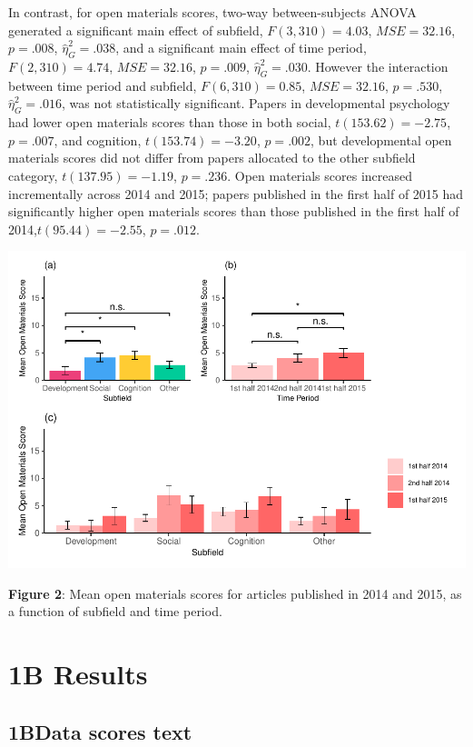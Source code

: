\documentclass[
  english,
  man]{apa6}
\begin{document}
In contrast, for open materials scores, two-way between-subjects ANOVA generated a significant main effect of subfield, \(F(3, 310) = 4.03\), \(\mathit{MSE} = 32.16\), \(p = .008\), \(\hat{\eta}^2_G = .038\), and a significant main effect of time period, \(F(2, 310) = 4.74\), \(\mathit{MSE} = 32.16\), \(p = .009\), \(\hat{\eta}^2_G = .030\). However the interaction between time period and subfield, \(F(6, 310) = 0.85\), \(\mathit{MSE} = 32.16\), \(p = .530\), \(\hat{\eta}^2_G = .016\), was not statistically significant. Papers in developmental psychology had lower open materials scores than those in both social, \(t(153.62) = -2.75\), \(p = .007\), and cognition, \(t(153.74) = -3.20\), \(p = .002\), but developmental open materials scores did not differ from papers allocated to the other subfield category, \(t(137.95) = -1.19\), \(p = .236\). Open materials scores increased incrementally across 2014 and 2015; papers published in the first half of 2015 had significantly higher open materials scores than those published in the first half of 2014,\(t(95.44) = -2.55\), \(p = .012\).

\includegraphics{icd_special_issue_files/figure-latex/1A-m-plots-1.pdf}

\textbf{Figure 2}: Mean open materials scores for articles published in 2014 and 2015, as a function of subfield and time period.

\hypertarget{b-results}{%
\section{1B Results}\label{b-results}}

\hypertarget{bdata-scores-text}{%
\subsection{1BData scores text}\label{bdata-scores-text}}
\end{document}
